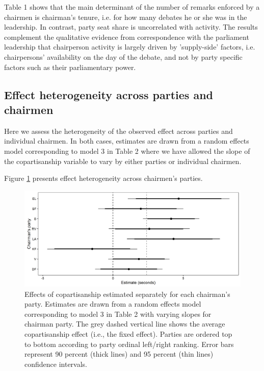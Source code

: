 \documentclass[12pt,a4paper]{article}
\begin{document}
Table 1 shows that the main determinant of the number of remarks enforced by a chairmen is chairman's tenure, i.e. for how many debates he or she was in the leadership. In contrast, party seat share is uncorrelated with activity. The results complement the qualitative evidence from correspondence with the parliament leadership that chairperson activity is largely driven by 'supply-side' factors, i.e. chairpersons' availability on the day of the debate, and not by party specific factors such as their parliamentary power.


\clearpage
\subsection{Effect heterogeneity across parties and chairmen}\label{appchairranef}

Here we assess the heterogeneity of the observed effect across parties and individual chairmen. In both cases, estimates are drawn from a random effects model corresponding to model 3 in Table 2 where we have allowed the slope of the copartisanship variable to vary by either parties or individual chairmen.

Figure \ref{partyranefs} presents effect heterogeneity across chairmen's parties.

\begin{figure}[!h]
\centering
\includegraphics[scale=.55]{../figures/parlbias_partyranefs.png}
\caption{Effects of copartisanship estimated separately for each chairman's party. Estimates are drawn from a random effects model corresponding to model 3 in Table 2 with varying slopes for chairman party. The grey dashed vertical line shows the average copartisanship effect (i.e., the fixed effect). Parties are ordered top to bottom according to party ordinal left/right ranking. Error bars represent 90 percent (thick lines) and 95 percent (thin lines) confidence intervals.}\label{partyranefs}
\end{figure}
\end{document}
